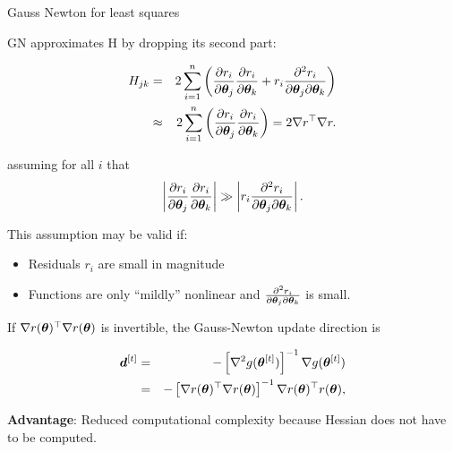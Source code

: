 \documentclass[11pt,compress,t,notes=noshow, xcolor=table]{beamer}
\begin{document}
\begin{vbframe}{Gauss Newton for least squares}

GN approximates H by dropping its second part:

\begin{eqnarray*}
H_{jk} &=& 2 \sum\limits_{i=1}^n \left(\frac{\partial r_i}{\partial \bm{\theta}_j}\frac{\partial r_i}{\partial \bm{\theta}_k} + r_i \frac{\partial^2 r_i}{\partial \bm{\theta}_j \partial \bm{\theta}_k}\right) \\
&\approx&  2 \sum\limits_{i=1}^n \left(\frac{\partial r_i}{\partial \bm{\theta}_j}\frac{\partial r_i}{\partial \bm{\theta}_k}\right) = 2 \nabla r^\top \nabla r.  
\end{eqnarray*}

assuming for all $i$ that 
$$
	 \left|\frac{\partial r_i}{\partial \bm{\theta}_j}\frac{\partial r_i}{\partial \bm{\theta}_k}\right| \gg \left|r_i \frac{\partial^2 r_i}{\partial \bm{\theta}_j \partial \bm{\theta}_k}\right|.
$$

This assumption may be valid if: 

\begin{itemize}
	\item Residuals $r_i$ are small in magnitude
	\item Functions are only \enquote{mildly} nonlinear and $\frac{\partial^2 r_i}{\partial \bm{\theta}_j \partial \bm{\theta}_k}$ is small. 
\end{itemize}

\framebreak 

If $\nabla r(\bm{\theta})^\top \nabla r(\bm{\theta})$ is invertible, the Gauss-Newton update direction is 

\begin{eqnarray*}
\bm{d}^{[t]} &=& - \left[\nabla^2 g(\bm{\theta}^{[t]})\right]^{-1} \nabla g(\bm{\theta}^{[t]}) \\
&=& - \left[\nabla r(\bm{\theta})^\top \nabla r(\bm{\theta})\right]^{-1} \nabla r(\bm{\theta})^\top r(\bm{\theta}),
\end{eqnarray*}

\lz

\textbf{Advantage}: Reduced computational complexity because Hessian does not have to be computed. 




\end{vbframe}
\end{document}
